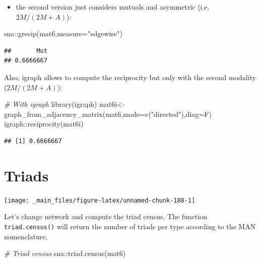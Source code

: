 \documentclass[
  notitlepage,
  onecolumn,
  openany]{book}
\newenvironment{Shaded}{\begin{snugshade}}{\end{snugshade}}
\newcommand{\AttributeTok}[1]{\textcolor[rgb]{0.77,0.63,0.00}{#1}}
\newcommand{\CommentTok}[1]{\textcolor[rgb]{0.56,0.35,0.01}{\textit{#1}}}
\newcommand{\FunctionTok}[1]{\textcolor[rgb]{0.00,0.00,0.00}{#1}}
\newcommand{\NormalTok}[1]{#1}
\newcommand{\OtherTok}[1]{\textcolor[rgb]{0.56,0.35,0.01}{#1}}
\newcommand{\SpecialCharTok}[1]{\textcolor[rgb]{0.00,0.00,0.00}{#1}}
\newcommand{\StringTok}[1]{\textcolor[rgb]{0.31,0.60,0.02}{#1}}
\providecommand{\tightlist}{%
  \setlength{\itemsep}{0pt}\setlength{\parskip}{0pt}}
\begin{document}
\begin{itemize}
\tightlist
\item
  the second version just considers mutuals and asymmetric (i.e.~\(2M/(2M+A)\)):
\end{itemize}

\begin{Shaded}
\begin{Highlighting}[]
\NormalTok{sna}\SpecialCharTok{::}\FunctionTok{grecip}\NormalTok{(mat6,}\AttributeTok{measure=}\StringTok{"edgewise"}\NormalTok{)}
\end{Highlighting}
\end{Shaded}

\begin{verbatim}
##       Mut 
## 0.6666667
\end{verbatim}

Also, igraph allows to compute the reciprocity but only with the second modality (\(2M/(2M+A)\)):

\begin{Shaded}
\begin{Highlighting}[]
\CommentTok{\# With igraph}
\FunctionTok{library}\NormalTok{(igraph)}
\NormalTok{mat6i}\OtherTok{\textless{}{-}}\FunctionTok{graph\_from\_adjacency\_matrix}\NormalTok{(mat6,}\AttributeTok{mode=}\FunctionTok{c}\NormalTok{(}\StringTok{"directed"}\NormalTok{),}\AttributeTok{diag=}\NormalTok{F)}
\NormalTok{igraph}\SpecialCharTok{::}\FunctionTok{reciprocity}\NormalTok{(mat6i)}
\end{Highlighting}
\end{Shaded}

\begin{verbatim}
## [1] 0.6666667
\end{verbatim}

\hypertarget{triads-1}{%
\section{Triads}\label{triads-1}}

\texttt{[image: \_main\_files/figure-latex/unnamed-chunk-188-1]}

Let's change network and compute the triad census. The function \texttt{triad.census()} will return the number of triads per type according to the MAN nomenclature.

\begin{Shaded}
\begin{Highlighting}[]
\CommentTok{\# Triad census}
\NormalTok{sna}\SpecialCharTok{::}\FunctionTok{triad.census}\NormalTok{(mat6)}
\end{Highlighting}
\end{Shaded}
\end{document}
